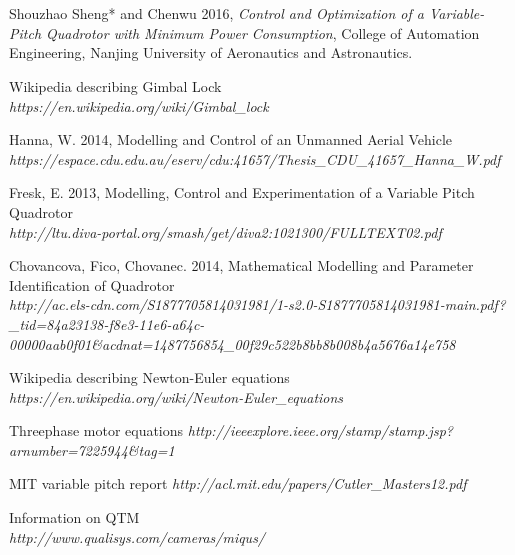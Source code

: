 \section *  {}

\begin{thebibliography}{9}


Shouzhao Sheng* and Chenwu 2016,      %
\textit{Control and Optimization of a Variable-Pitch
Quadrotor with Minimum Power Consumption},   %
College of Automation Engineering, Nanjing University of Aeronautics and Astronautics.
        

        Wikipedia describing Gimbal Lock \\ 
\textit{https://en.wikipedia.org/wiki/Gimbal{\_}lock}

        Hanna, W. 2014, Modelling and Control of an Unmanned Aerial Vehicle \\ 
\textit{https://espace.cdu.edu.au/eserv/cdu:41657/Thesis{\_}CDU{\_}41657{\_}Hanna{\_}W.pdf}

        Fresk, E. 2013, Modelling, Control and Experimentation of a Variable Pitch Quadrotor \\ 
\textit{http://ltu.diva-portal.org/smash/get/diva2:1021300/FULLTEXT02.pdf}

        Chovancova, Fico, Chovanec. 2014, Mathematical Modelling and Parameter Identification of Quadrotor \\ 
\textit{http://ac.els-cdn.com/S1877705814031981/1-s2.0-S1877705814031981-main.pdf?_tid=84a23138-f8e3-11e6-a64c-00000aab0f01&acdnat=1487756854{\_}00f29c522b8bb8b008b4a5676a14e758}

        Wikipedia describing Newton-Euler equations \\ 
\textit{https://en.wikipedia.org/wiki/Newton-Euler{\_}equations}

    Threephase motor equations
\textit{http://ieeexplore.ieee.org/stamp/stamp.jsp?arnumber=7225944&tag=1}

    MIT variable pitch report
\textit{http://acl.mit.edu/papers/Cutler_Masters12.pdf}

             Information on QTM \\ 
\textit{http://www.qualisys.com/cameras/miqus/}


\end{thebibliography}




